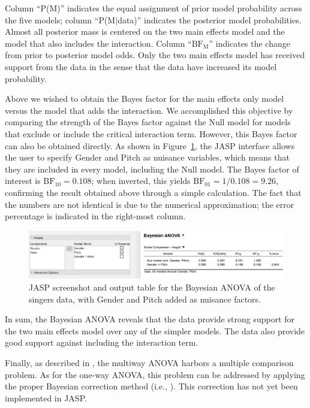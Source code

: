 Column ``P(M)'' indicates the equal assignment of prior model probability across the five models; column ``P(M$|$data)'' indicates the posterior model probabilities. Almost all posterior mass is centered on the two main effects model and the model that also includes the interaction. Column ``$\text{BF}_\text{M}$'' indicates the change from prior to posterior model odds. Only the two main effects model has received support from the data in the sense that the data have increased its model probability.

Above we wished to obtain the Bayes factor for the main effects only model versus the model that adds the interaction. We accomplished this objective by comparing the strength of the Bayes factor against the Null model for models that exclude or include the critical interaction term. However, this Bayes factor can also be obtained directly. As shown in Figure~\ref{fig:bi2:SingersNuisanceBANOVATable}, the JASP interface allows the user to specify Gender and Pitch as nuisance variables, which means that they are included in every model, including the Null model. The Bayes factor of interest is $\text{BF}_{10} = 0.108$; when inverted, this yields $\text{BF}_{01} = 1/0.108 = 9.26$, confirming the result obtained above through a simple calculation. The fact that the numbers are not identical is due to the numerical approximation; the error percentage is indicated in the right-most column.

\begin{figure}[tp]
    \begin{center}
        \includegraphics[width=1\textwidth]{figs/bi2_SingersNuisanceBANOVATable.eps}
        \caption{JASP screenshot and output table for the Bayesian ANOVA of the singers data, with Gender and Pitch added as nuisance factors.} \label{fig:bi2:SingersNuisanceBANOVATable}
    \end{center}
\end{figure}

In sum, the Bayesian ANOVA reveals that the data provide strong support for the two main effects model over any of the simpler models. The data also provide good support against including the interaction term.

Finally, as described in , the multiway ANOVA harbors a multiple comparison problem. As for the one-way ANOVA, this problem can be addressed by applying the proper Bayesian correction method (i.e., ). This correction has not yet been implemented in JASP.

